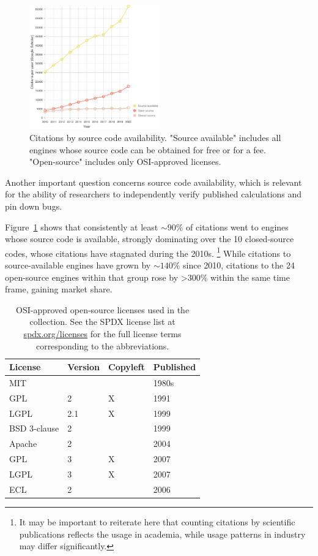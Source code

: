 \documentclass[9pt,review]{livecoms}
\begin{document}
\begin{figure}
    \includegraphics[width=0.5\textwidth]{figures/code-availability}
    \caption{
        Citations by source code availability.
        "Source available" includes all engines whose source code can be obtained for free or for a fee.
        "Open-source" includes only OSI-approved licenses.
    }
    \label{fig:code-availability}
\end{figure}


Another important question concerns  source code availability, which is relevant for the ability of researchers to independently verify published calculations and pin down bugs.

Figure~\ref{fig:code-availability} shows that consistently at least ${\sim}90\%$ of citations went to engines whose source code is available, strongly dominating over the 10 closed-source codes, whose citations have stagnated during the 2010s.%
\footnote{It may be important to reiterate here that counting citations by scientific publications reflects the usage in academia, while usage patterns in industry may differ significantly.}
While citations to source-available engines have grown by ${\sim}140\%$ since 2010, 
citations to the 24 open-source engines within that group rose by >300\% within the same time frame, gaining market share.

\begin{table}
    \centering
    \begin{tabular}{llll} \toprule
        License & Version & Copyleft & Published  \\ \midrule
        MIT &   &   & 1980s\\
        GPL & 2 & X & 1991\\
        LGPL & 2.1 & X & 1999\\
        BSD 3-clause & 2 &   & 1999\\
        Apache & 2 &   & 2004\\
        GPL & 3 & X & 2007\\
        LGPL & 3 & X & 2007\\
        ECL & 2 &   & 2006\\
\bottomrule
    \end{tabular}
    \caption{
        OSI-approved open-source licenses used in the collection.
        See the SPDX license list at \url{spdx.org/licenses} for the full license terms corresponding to the abbreviations.
    }
    \label{tab:open-source-licenses}
\end{table}
\end{document}
